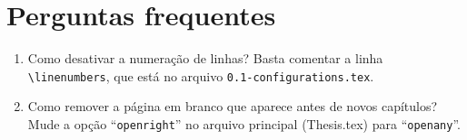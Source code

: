   \section{Perguntas frequentes}

    \begin{enumerate}
      \item Como desativar a numeração de linhas? 
        \subitem Basta comentar a linha \texttt{\textbackslash linenumbers}, que está no arquivo \texttt{0.1-configurations.tex}.
      \item Como remover a página em branco que aparece antes de novos capítulos? 
        \subitem Mude a opção ``\texttt{openright}'' no arquivo principal (Thesis.tex) para ``\texttt{openany}''.
    \end{enumerate}
